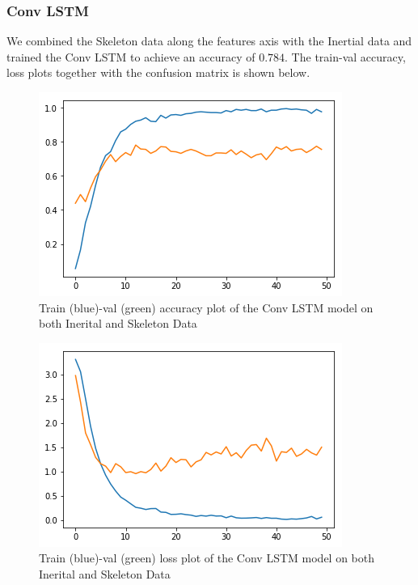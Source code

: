 \documentclass[conference]{IEEEtran}
\begin{document}
\subsubsection{Conv LSTM}
We combined the Skeleton data along the features axis with the Inertial data and trained the Conv LSTM to achieve an accuracy of $0.784$. The train-val accuracy, loss plots together with the confusion matrix is shown below.
\begin{figure}[H]
\begin{center}
\includegraphics[scale=0.4]{conv_LSTM_iner_skel/conv_LSTM_acc_plot_iner_skel.png}
\end{center}
\caption{\label{fig:train_val_acc_conv_LSTM_iner_skel} 
Train (blue)-val (green) accuracy plot of the Conv LSTM model on both Inerital and Skeleton Data}
\end{figure}
\begin{figure}[H]
\begin{center}
\includegraphics[scale=0.4]{conv_LSTM_iner_skel/conv_LSTM_loss_plot_iner_skel.png}
\end{center}
\caption{\label{fig:train_val_loss_conv_LSTM_iner_skel} 
Train (blue)-val (green) loss plot of the Conv LSTM model on both Inerital and Skeleton Data}
\end{figure}
\end{document}
